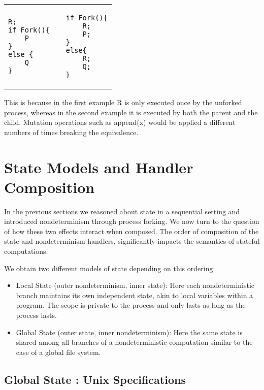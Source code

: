 \documentclass[logo,bsc,singlespacing,parskip]{infthesis}
\begin{document}
\vspace{-2em}
\begin{table}[H]
\centering
\begin{tabular}{p{} c p{}}
\begin{lstlisting}
R;
if Fork(){
    P
}
else {
    Q
}
\end{lstlisting}
&
&
\begin{lstlisting}
if Fork(){
    R; 
    P;
} 
else{
    R; 
    Q; 
}
\end{lstlisting}
\end{tabular}
\end{table}
\vspace{-2em}
This is because in the first example R is only executed once by the unforked process, whereas in the second example it is executed by both the parent and the child. 
Mutation operations such as append(x) would be applied a different numbers of times breaking the equivalence.





\section{State Models and Handler Composition}
In the previous sections we reasoned about state in a  sequential setting and introduced nondeterminism through process forking. We now turn to the question of how these two effects interact when composed. The order of composition of the state and nondeterminism handlers, significantly impacts the semantics of stateful computations. 

We obtain two different models of state depending on this ordering:
\begin{itemize}
    \item Local State (outer nondeterminism, inner state): Here each nondeterministic branch maintains its own independent state, akin to local variables within a program. The scope is private to the process and only lasts as long as the process lasts.
    \item Global State (outer state, inner nondeterminism): Here the same state is shared among all branches of a nondeterministic computation similar to the case of a global file system.
\end{itemize}







\subsection{Global State : Unix Specifications}
\end{document}
